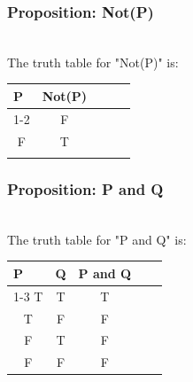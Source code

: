 \documentclass[aspectratio=169]{beamer}
\numberwithin{equation}{section}
\begin{document}
\begin{frame}
\frametitle{Proposition: Not(P)}

\ \\The truth table for "Not(P)" is:

\begin{table}[]
\begin{tabular}{lllll}
P                     & Not(P)                &  &  &  \\ \cline{1-2}
\multicolumn{1}{c}{T} & \multicolumn{1}{c}{F} &  &  &  \\
\multicolumn{1}{c}{F} & \multicolumn{1}{c}{T} &  &  &  \\
                      &                       &  &  & 
\end{tabular}
\end{table}

\end{frame}



\begin{frame}
\frametitle{Proposition: P and Q}

\ \\The truth table for "P and Q" is:

\begin{table}[]
\begin{tabular}{cccll}
\multicolumn{1}{l}{P} & \multicolumn{1}{l}{Q} & \multicolumn{1}{l}{P and Q} &  &  \\ \cline{1-3}
T                     & T                     & T                           &  &  \\
T                     & F                     & F                           &  &  \\
F                     & T                     & F                           &  &  \\
F                     & F                     & F                           &  & 
\end{tabular}
\end{table} 


\end{frame}
\end{document}
